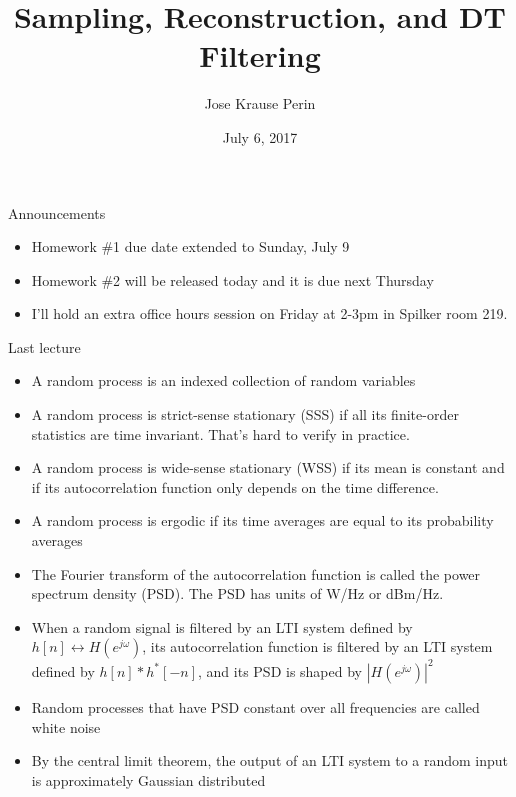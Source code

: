 \documentclass[10pt]{beamer}
\title[EE 264]{Sampling, Reconstruction, and DT Filtering}
\author{Jose Krause Perin}
\institute{Stanford University}
\date{July 6, 2017}
\begin{document}
\begin{frame}
  \titlepage
\end{frame}

\begin{frame}{Announcements}

\begin{itemize}
	\item Homework \#1 due date extended to Sunday, July 9
	\item Homework \#2 will be released today and it is due next Thursday
	\item I'll hold an extra office hours session on Friday at 2-3pm in Spilker room 219.
\end{itemize}

\end{frame}


\begin{frame}{Last lecture}
\begin{itemize}
	\item A random process is an indexed collection of random variables
	\item A random process is strict-sense stationary (SSS) if all its finite-order statistics are time invariant. That's hard to verify in practice.
	\item A random process is wide-sense stationary (WSS) if its mean is constant and if its autocorrelation function only depends on the time difference. 
	\item A random process is ergodic if its time averages are equal to its probability averages
	\item The Fourier transform of the autocorrelation function is called the power spectrum density (PSD). The PSD has units of W/Hz or dBm/Hz.
	\item When a random signal is filtered by an LTI system defined by $h[n]\leftrightarrow H(e^{j\omega})$, its autocorrelation function is filtered by an LTI system defined by $h[n]\ast h^*[-n]$, and its PSD is shaped by $|H(e^{j\omega})|^2$
	\item Random processes that have PSD constant over all frequencies are called white noise
	\item By the central limit theorem, the output of an LTI system to a random input is approximately Gaussian distributed
\end{itemize}
\end{frame}
\end{document}

